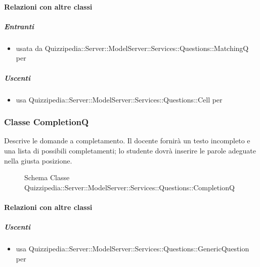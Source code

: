 \paragraph{Relazioni con altre classi}
\subparagraph{Entranti}
\begin{itemize}
\item usata da Quizzipedia::Server::ModelServer::Services::Questions::MatchingQ per 
\end{itemize}
\subparagraph{Uscenti}
\begin{itemize}
\item usa Quizzipedia::Server::ModelServer::Services::Questions::Cell per 
\end{itemize}
\subsubsection{Classe CompletionQ}
Descrive le domande a completamento. Il docente fornirà un testo incompleto e una lista di possibili completamenti; lo studente dovrà inserire le parole adeguate nella giusta posizione.
\begin{figure}[H]
\centering
\noindent{}
\caption[Schema Classe CompletionQ]{Schema Classe Quizzipedia::Server::ModelServer::Services::Questions::CompletionQ}
\end{figure}
\paragraph{Relazioni con altre classi}
\subparagraph{Uscenti}
\begin{itemize}
\item usa Quizzipedia::Server::ModelServer::Services::Questions::GenericQuestion per 
\end{itemize}
